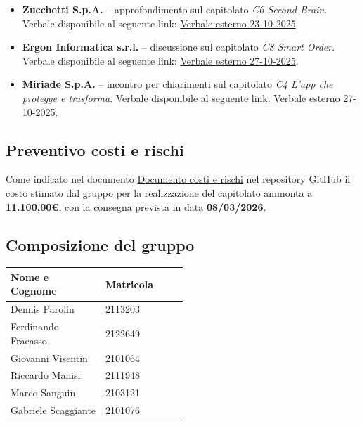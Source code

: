 \documentclass[a4paper,12pt]{article}
\begin{document}
\begin{itemize}
    \item \textbf{Zucchetti S.p.A.} – approfondimento sul capitolato \emph{C6 Second Brain}.  
    Verbale disponibile al seguente link: \href{https://github.com/SWE-BitByBit/SWE-project/blob/b4a282f97b3f753d4b3a3d8ac04358c3975b11d2/verbali_esterni/23-10-25/verbale_esterno_C6_firmato.pdf}{Verbale esterno 23-10-2025}.
    \item \textbf{Ergon Informatica s.r.l.} – discussione sul capitolato \emph{C8 Smart Order}.  
    Verbale disponibile al seguente link: \href{https://github.com/SWE-BitByBit/SWE-project/blob/b4a282f97b3f753d4b3a3d8ac04358c3975b11d2/verbali_esterni/27-10-25_Incontro_C8/verbale_esterno_C8_firmato.pdf}{Verbale esterno 27-10-2025}.
    \item \textbf{Miriade S.p.A.} – incontro per chiarimenti sul capitolato \emph{C4 L’app che protegge e trasforma}.  
    Verbale disponibile al seguente link: \href{https://github.com/SWE-BitByBit/SWE-project/blob/b4a282f97b3f753d4b3a3d8ac04358c3975b11d2/verbali_esterni/27-10-25_Incontro_C4/verbale_esterno_C4_firmato.pdf}{Verbale esterno 27-10-2025}.
\end{itemize}

\subsection{Preventivo costi e rischi}
Come indicato nel documento \href{https://github.com/SWE-BitByBit/SWE-project/blob/b4a282f97b3f753d4b3a3d8ac04358c3975b11d2/candidatura/Documento_costi_e_rischi.pdf}{Documento costi e rischi} nel repository GitHub il costo stimato dal gruppo per la realizzazione del capitolato ammonta a \textbf{11.100,00€}, con la consegna prevista in data \textbf{08/03/2026}.

\subsection{Composizione del gruppo}

\begin{center}
\small
\renewcommand{\arraystretch}{1.2}
\begin{tabular}{|p{0.3\linewidth}|p{0.2\linewidth}|}
\hline
\rowcolor{gray!60}
\textbf{Nome e Cognome} & \textbf{Matricola} \\
\hline
Dennis Parolin & 2113203 \\
\hline
Ferdinando Fracasso & 2122649 \\
\hline
Giovanni Visentin & 2101064 \\
\hline
Riccardo Manisi & 2111948 \\
\hline
Marco Sanguin & 2103121 \\
\hline
Gabriele Scaggiante & 2101076 \\
\hline
\end{tabular}
\end{center}
\end{document}
